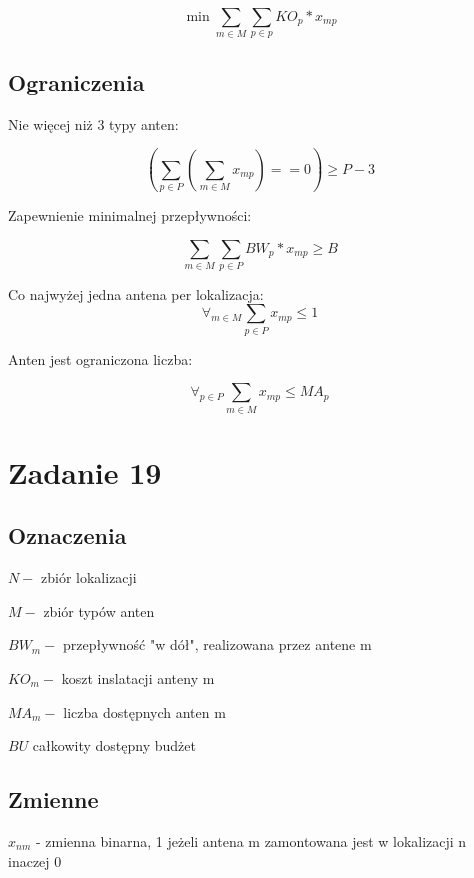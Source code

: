 \documentclass{article}
\begin{document}
\begin{equation}
  \min \sum_{m \in M} \sum_{p \in p} KO_p * x_{mp}
\end{equation}

\subsection{Ograniczenia}
Nie więcej niż 3 typy anten:

\begin{equation}
   (\sum_{p \in P}(\sum_{m \in M} x_{mp}) == 0) \geq P-3
\end{equation}

Zapewnienie minimalnej przepływności:

\begin{equation}
  \sum_{m \in M} \sum_{p \in P} BW_p * x_{mp} \geq B
\end{equation}

Co najwyżej jedna antena per lokalizacja:
\begin{equation}
  \forall_{m \in M} \sum_{p \in P} x_{mp} \leq 1
\end{equation}

Anten jest ograniczona liczba:

\begin{equation}
  \forall_{p \in P} \sum_{m \in M} x_{mp} \leq {MA}_p
\end{equation}


\section{Zadanie 19}

\subsection{Oznaczenia}
$N -$ zbiór lokalizacji

$M -$ zbiór typów anten

$BW_m -$ przepływność "w dół", realizowana przez antene m

$KO_m -$ koszt inslatacji anteny m

$MA_m -$ liczba dostępnych anten m

$BU$ całkowity dostępny budżet

\subsection{Zmienne}
$x_{nm}$ - zmienna binarna, 1 jeżeli antena m zamontowana jest w lokalizacji n inaczej 0
\end{document}
